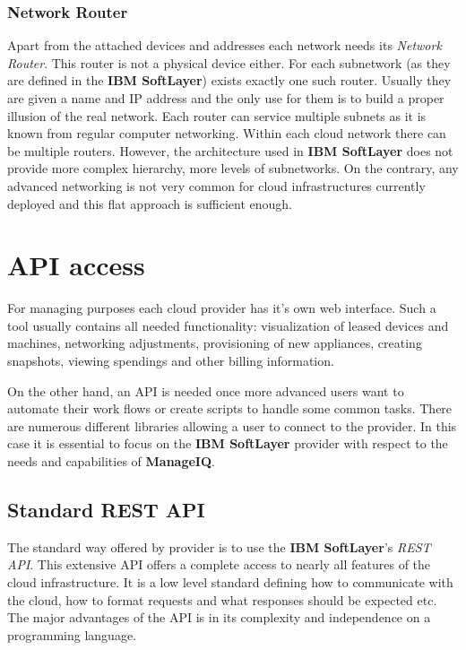 \subsubsection{Network Router}
\label{subs:Network Router}

Apart from the attached devices and addresses each network needs its \emph{Network Router}. This router is not a physical device either. For each subnetwork (as they are defined in the \textbf{IBM SoftLayer}) exists exactly one such router. Usually they are given a name and IP address and the only use for them is to build a proper illusion of the real network. Each router can service multiple subnets as it is known from regular computer networking. Within each cloud network there can be multiple routers. However, the architecture used in \textbf{IBM SoftLayer} does not provide more complex hierarchy, more levels of subnetworks. On the contrary, any advanced networking is not very common for cloud infrastructures currently deployed and this flat approach is sufficient enough.

\section{API access}
\label{sec:API access}

For managing purposes each cloud provider has it's own web interface. Such a tool usually contains all needed functionality: visualization of leased devices and machines, networking adjustments, provisioning of new appliances, creating snapshots, viewing spendings and other billing information.

On the other hand, an API is needed once more advanced users want to automate their work flows or create scripts to handle some common tasks. There are numerous different libraries allowing a user to connect to the provider. In this case it is essential to focus on the \textbf{IBM SoftLayer} provider with respect to the needs and capabilities of \textbf{ManageIQ}.

\subsection{Standard REST API}
\label{sub:Standard REST API}

The standard way offered by provider is to use the \textbf{IBM SoftLayer}'s \emph{REST API}\cite{restapi}. This extensive API offers a complete access to nearly all features of the cloud infrastructure. It is a low level standard defining how to communicate with the cloud, how to format requests and what responses should be expected etc. The major advantages of the API is in its complexity and independence on a programming language.

